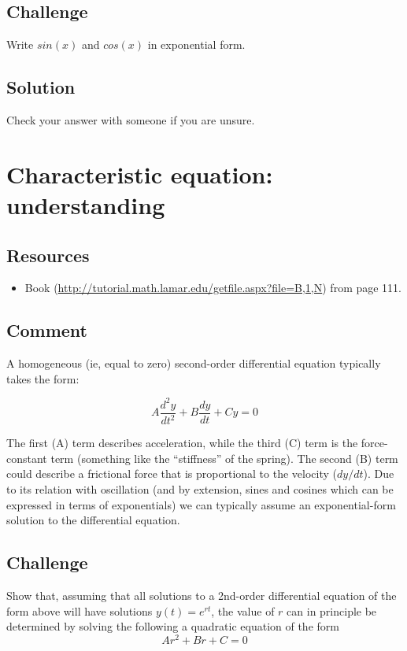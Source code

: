 \subsection*{Challenge}
Write $sin(x)$ and $cos(x)$ in exponential form.

\subsection*{Solution}

Check your answer with someone if you are unsure.




\newpage
\section{Characteristic equation: understanding}

\subsection*{Resources}
\begin{itemize}
    \item Book (\url{http://tutorial.math.lamar.edu/getfile.aspx?file=B,1,N}) from page 111.
\end{itemize}

\subsection*{Comment}
A homogeneous (ie, equal to zero) second-order differential equation typically takes the form:

\begin{equation}
    A \frac{d^2y}{dt^2} + B \frac{dy}{dt} + C y = 0
\end{equation}

The first (A) term describes acceleration, while the third (C) term is the force-constant term (something like the ``stiffness'' of the spring). The second (B) term could describe a frictional force that is proportional to the velocity ($dy/dt$). Due to its relation with oscillation (and by extension, sines and cosines which can be expressed in terms of exponentials) we can typically assume an exponential-form solution to the differential equation.

\subsection*{Challenge}
Show that, assuming that all solutions to a 2nd-order differential equation of the form above will have solutions $y(t)=e^{rt}$, the value of $r$ can in principle be determined by solving the following a quadratic equation of the form
\begin{equation}
    A r^2 + Br + C = 0
\end{equation}

